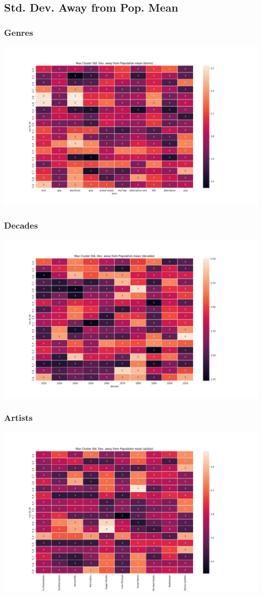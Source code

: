 \subsection{Std. Dev. Away from Pop. Mean}
    \subsubsection{Genres}
        \includegraphics[width=1.2\textwidth]{sd_away_terms}
    \subsubsection{Decades}
        \includegraphics[width=1.2\textwidth]{sd_away_decades}
    \subsubsection{Artists}
        \includegraphics[width=1.2\textwidth]{sd_away_artists}

